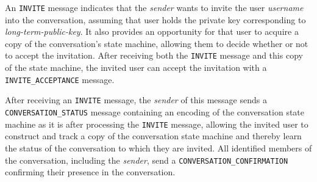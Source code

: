 \documentclass{article}
\def\message#1{\texttt{#1}}
\def\field#1{\textit{#1}}
\begin{document}
An \message{INVITE} message indicates that the \field{sender} wants to invite the user \field{username} into the conversation, assuming that user holds the private key corresponding to \field{long-term-public-key}.
It also provides an opportunity for that user to acquire a copy of the conversation's state machine, allowing them to decide whether or not to accept the invitation.
After receiving both the \message{INVITE} message and this copy of the state machine, the invited user can accept the invitation with a \message{INVITE\_ACCEPTANCE} message.

After receiving an \message{INVITE} message, the \field{sender} of this message sends a \message{CONVERSATION\_STATUS} message containing an encoding of the conversation state machine as it is after processing the \message{INVITE} message, allowing the invited user to construct and track a copy of the conversation state machine and thereby learn the status of the conversation to which they are invited.
All identified members of the conversation, including the \field{sender}, send a \message{CONVERSATION\_CONFIRMATION} confirming their presence in the conversation.
\end{document}
